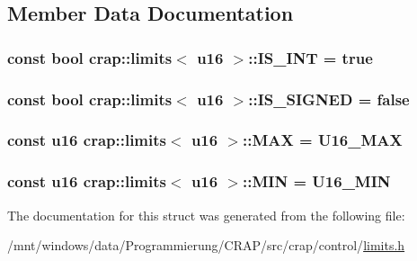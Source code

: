 \subsection{Member Data Documentation}
\hypertarget{structcrap_1_1limits_3_01u16_01_4_aac89c7feebcee8d2995ad4f673bd2b2b}{
\subsubsection[{I\-S\-\_\-\-I\-N\-T}]{\setlength{\rightskip}{0pt plus 5cm}const bool {\bf crap\-::limits}$<$ {\bf u16} $>$\-::I\-S\-\_\-\-I\-N\-T = true\hspace{0.3cm}{\ttfamily [static]}}}\label{structcrap_1_1limits_3_01u16_01_4_aac89c7feebcee8d2995ad4f673bd2b2b}
\hypertarget{structcrap_1_1limits_3_01u16_01_4_a8b3d63b1536b733d7050d518cf81ae6a}{
\subsubsection[{I\-S\-\_\-\-S\-I\-G\-N\-E\-D}]{\setlength{\rightskip}{0pt plus 5cm}const bool {\bf crap\-::limits}$<$ {\bf u16} $>$\-::I\-S\-\_\-\-S\-I\-G\-N\-E\-D = false\hspace{0.3cm}{\ttfamily [static]}}}\label{structcrap_1_1limits_3_01u16_01_4_a8b3d63b1536b733d7050d518cf81ae6a}
\hypertarget{structcrap_1_1limits_3_01u16_01_4_afe9d8a17c2f0208f423347b1744ac06d}{
\subsubsection[{M\-A\-X}]{\setlength{\rightskip}{0pt plus 5cm}const {\bf u16} {\bf crap\-::limits}$<$ {\bf u16} $>$\-::M\-A\-X = {\bf U16\-\_\-\-M\-A\-X}\hspace{0.3cm}{\ttfamily [static]}}}\label{structcrap_1_1limits_3_01u16_01_4_afe9d8a17c2f0208f423347b1744ac06d}
\hypertarget{structcrap_1_1limits_3_01u16_01_4_ac704c0d0f11c157ac4f1a4abd49c2bb8}{
\subsubsection[{M\-I\-N}]{\setlength{\rightskip}{0pt plus 5cm}const {\bf u16} {\bf crap\-::limits}$<$ {\bf u16} $>$\-::M\-I\-N = {\bf U16\-\_\-\-M\-I\-N}\hspace{0.3cm}{\ttfamily [static]}}}\label{structcrap_1_1limits_3_01u16_01_4_ac704c0d0f11c157ac4f1a4abd49c2bb8}


The documentation for this struct was generated from the following file\-:\begin{DoxyCompactItemize}
\item 
/mnt/windows/data/\-Programmierung/\-C\-R\-A\-P/src/crap/control/\hyperlink{limits_8h}{limits.\-h}\end{DoxyCompactItemize}

